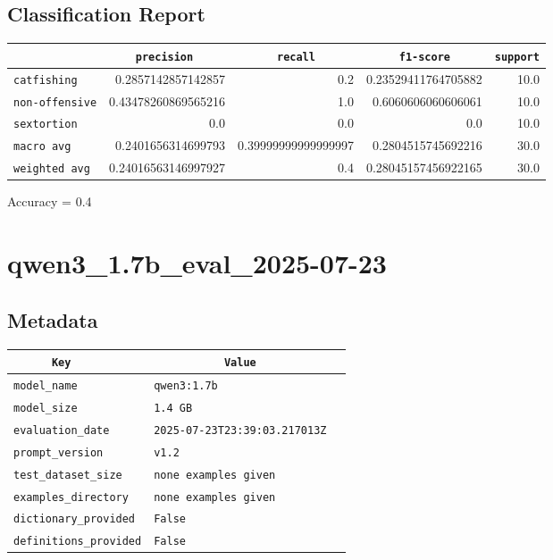 \documentclass{article}
\begin{document}
\subsection{Classification Report}

\begin{center}
\begin{tabular}{l | r | r | r | r} \hline
    \verb|            | & \verb|    precision     | & \verb|      recall      | & \verb|     f1-score     | & \verb|support| \\ \hline
    \hline
    \verb|catfishing | & 0.2857142857142857 & 0.2 & 0.23529411764705882 &    10.0 \\ \hline
    \verb|non-offensive| & 0.43478260869565216 & 1.0 & 0.6060606060606061 &    10.0 \\ \hline
    \verb|sextortion | & 0.0 & 0.0 & 0.0 &    10.0 \\ \hline
    \verb|macro avg  | & 0.2401656314699793 & 0.39999999999999997 & 0.2804515745692216 &    30.0 \\ \hline
    \verb|weighted avg| & 0.24016563146997927 & 0.4 & 0.28045157456922165 &    30.0 \\ \hline
\end{tabular}
\end{center}

\begin{center}
Accuracy = 0.4
\end{center}

\section{qwen3\_1.7b\_eval\_2025-07-23}
\subsection{Metadata}

\begin{center}
\begin{tabular}{l | l} \hline
    \verb|      Key      | & \verb|           Value           | \\ \hline
    \hline
    \verb|model_name    | & \verb|qwen3:1.7b                   | \\ \hline
    \verb|model_size    | & \verb|1.4 GB                       | \\ \hline
    \verb|evaluation_date| & \verb|2025-07-23T23:39:03.217013Z  | \\ \hline
    \verb|prompt_version| & \verb|v1.2                         | \\ \hline
    \verb|test_dataset_size| & \verb|none examples given          | \\ \hline
    \verb|examples_directory| & \verb|none examples given          | \\ \hline
    \verb|dictionary_provided| & \verb|False                        | \\ \hline
    \verb|definitions_provided| & \verb|False                        | \\ \hline
\end{tabular}
\end{center}
\end{document}
